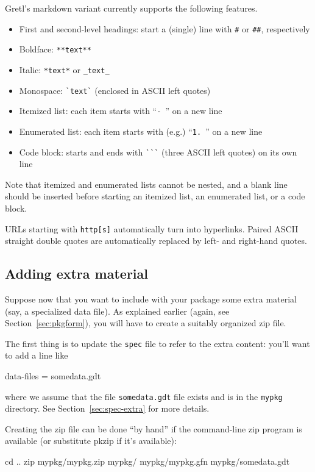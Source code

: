 \documentclass[oneside]{book}
\begin{document}
Gretl's markdown variant currently supports the following features.

\begin{itemize}
\item First and second-level headings: start a (single) line with
  \verb|#| or \verb|##|, respectively
\item Boldface: \verb|**text**|
\item Italic: \verb|*text*| or \verb|_text_|
\item Monospace: \verb|`text`| (enclosed in ASCII left quotes)
\item Itemized list: each item starts with ``\verb|- |'' on a new line
\item Enumerated list: each item starts with (e.g.) ``\verb|1. |''
  on a new line
\item Code block: starts and ends with \verb|```| (three ASCII left
  quotes) on its own line
\end{itemize}

Note that itemized and enumerated lists cannot be nested, and a blank
line should be inserted before starting an itemized list, an
enumerated list, or a code block.

URLs starting with \texttt{http[s]} automatically turn into
hyperlinks.  Paired ASCII straight double quotes are automatically
replaced by left- and right-hand quotes.

\subsection{Adding extra material}

Suppose now that you want to include with your package some extra
material (say, a specialized data file). As explained earlier (again,
see Section~\ref{sec:pkgform}), you will have to create a suitably
organized zip file.

The first thing is to update the \texttt{spec} file to refer to the
extra content: you'll want to add a line like
\begin{code}
data-files = somedata.gdt
\end{code}
where we assume that the file \texttt{somedata.gdt} file exists and is
in the \texttt{mypkg} directory. See Section~\ref{sec:spec-extra} for
more details.

Creating the zip file can be done ``by hand'' if the command-line
\textsf{zip} program is available (or substitute \textsf{pkzip} if
it's available):
\begin{code}
cd ..
zip mypkg/mypkg.zip mypkg/ mypkg/mypkg.gfn mypkg/somedata.gdt
\end{code}
\end{document}
